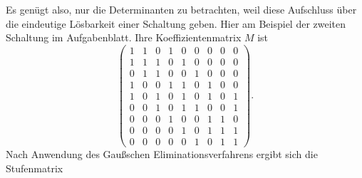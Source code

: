 \documentclass{scrartcl}
\begin{document}
Es genügt also, nur die Determinanten zu betrachten, weil diese Aufschluss über
die eindeutige Lösbarkeit einer Schaltung geben. Hier am Beispiel der zweiten
Schaltung im Aufgabenblatt. Ihre Koeffizientenmatrix $M$ ist
\begin{equation}
\begin{pmatrix}
  1&1&0&1&0&0&0&0&0\\
  1&1&1&0&1&0&0&0&0\\
  0&1&1&0&0&1&0&0&0\\
  1&0&0&1&1&0&1&0&0\\
  1&0&1&0&1&0&1&0&1\\
  0&0&1&0&1&1&0&0&1\\
  0&0&0&1&0&0&1&1&0\\
  0&0&0&0&1&0&1&1&1\\
  0&0&0&0&0&1&0&1&1
\end{pmatrix}.
\end{equation}
Nach Anwendung des Gaußschen Eliminationsverfahrens ergibt sich die
Stufenmatrix
\end{document}
